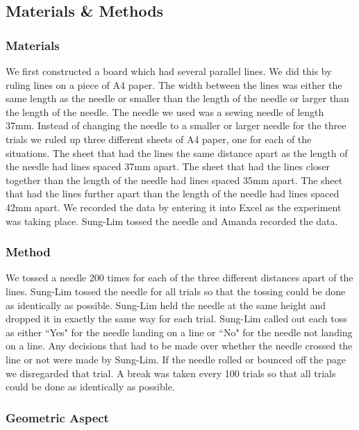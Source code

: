 \subsection{Materials \& Methods}

\subsubsection*{Materials}

We first constructed a board which had several parallel lines. We did this by ruling lines on a piece of A4 paper. The width between the lines was either the same length as the needle or smaller than the length of the needle or larger than the length of the needle. The needle we used was a sewing needle of length 37mm. Instead of changing the needle to a smaller or larger needle for the three trials we ruled up three different sheets of A4 paper, one for each of the situations. The sheet that had the lines the same distance apart as the length of the needle had lines spaced 37mm apart. The sheet that had the lines closer together than the length of the needle had lines spaced 35mm apart. The sheet that had the lines further apart than the length of the needle had lines spaced 42mm apart. We recorded the data by entering it into Excel as the experiment was taking place. Sung-Lim tossed the needle and Amanda recorded the data.

\subsubsection*{Method}

We tossed a needle 200 times for each of the three different distances apart of the lines. Sung-Lim tossed the needle for all trials so that the tossing could be done as identically as possible. Sung-Lim held the needle at the same height and dropped it in exactly the same way for each trial. Sung-Lim called out each toss as either ``Yes" for the needle landing on a line or ``No" for the needle not landing on a line. Any decisions that had to be made over whether the needle crossed the line or not were made by Sung-Lim. If the needle rolled or bounced off the page we disregarded that trial. A break was taken every 100 trials so that all trials could be done as identically as possible.

\subsubsection*{Geometric Aspect}

